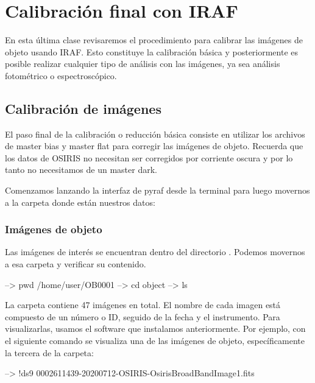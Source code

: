 \chapter{Calibración final con IRAF}
En esta última clase revisaremos el procedimiento para calibrar las imágenes de objeto usando IRAF. Esto constituye la calibración básica y posteriormente es posible realizar cualquier tipo de análisis con las imágenes, ya sea análisis fotométrico o espectroscópico. 

\section{Calibración de imágenes}
El paso final de la calibración o reducción básica consiste en utilizar los archivos de master bias y master flat para corregir las imágenes de objeto. Recuerda que los datos de OSIRIS no necesitan ser corregidos por corriente oscura y por lo tanto no necesitamos de un master dark. 

Comenzamos lanzando la interfaz de pyraf desde la terminal para luego movernos a la carpeta donde están nuestros datos:


\subsection{Imágenes de objeto}
Las imágenes de interés se encuentran dentro del directorio . Podemos movernos a esa carpeta y verificar su contenido. 

\begin{shell}
--> pwd
/home/user/OB0001
--> cd object
--> ls
\end{shell}

La carpeta  contiene 47 imágenes en total. El nombre de cada imagen está compuesto de un número o ID, seguido de la fecha y el instrumento. Para visualizarlas, usamos el software  que instalamos anteriormente. Por ejemplo, con el siguiente comando se visualiza una de las imágenes de objeto, específicamente la tercera de la carpeta:

\begin{shell}
--> !ds9 0002611439-20200712-OSIRIS-OsirisBroadBandImage1.fits
\end{shell}


